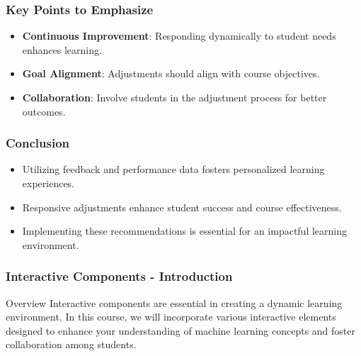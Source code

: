 \documentclass[aspectratio=169]{beamer}
\begin{document}
\begin{frame}[fragile]
    \frametitle{Key Points to Emphasize}
    \begin{itemize}
        \item \textbf{Continuous Improvement}: Responding dynamically to student needs enhances learning.
        \item \textbf{Goal Alignment}: Adjustments should align with course objectives.
        \item \textbf{Collaboration}: Involve students in the adjustment process for better outcomes.
    \end{itemize}
\end{frame}

\begin{frame}[fragile]
    \frametitle{Conclusion}
    \begin{itemize}
        \item Utilizing feedback and performance data fosters personalized learning experiences.
        \item Responsive adjustments enhance student success and course effectiveness.
        \item Implementing these recommendations is essential for an impactful learning environment.
    \end{itemize}
\end{frame}

\begin{frame}[fragile]
  \frametitle{Interactive Components - Introduction}
  \begin{block}{Overview}
    Interactive components are essential in creating a dynamic learning environment. In this course, we will incorporate various interactive elements designed to enhance your understanding of machine learning concepts and foster collaboration among students.
  \end{block}
\end{frame}
\end{document}
